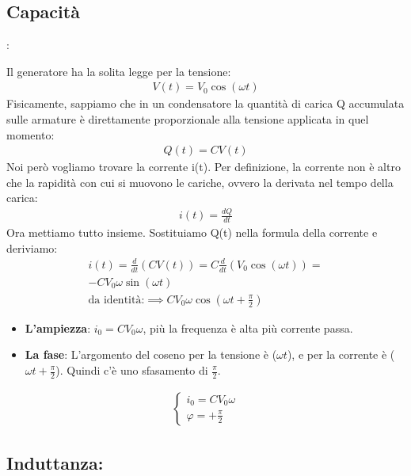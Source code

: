 \documentclass[a4paper, oneside]{article}
\begin{document}
\subsection*{Capacità}:
\begin{center}
\end{center}
Il generatore ha la solita legge per la tensione:
\begin{gather*}
    V(t) = V_0 \cos(\omega t)
\end{gather*}
Fisicamente, sappiamo che in un condensatore la quantità di carica Q accumulata sulle armature è direttamente proporzionale alla tensione applicata in quel momento:
\begin{gather*}
    Q(t) = C V(t)
\end{gather*}
Noi però vogliamo trovare la corrente i(t). Per definizione, la corrente non è altro che la rapidità con cui si muovono le cariche, ovvero la derivata nel tempo della carica:
\begin{gather*}
    i(t) = \frac{dQ}{dt}
\end{gather*}
Ora mettiamo tutto insieme. Sostituiamo Q(t) nella formula della corrente e deriviamo:
\begin{gather*}
    i(t) = \frac{d}{dt} (C V(t)) = C \frac{d}{dt} (V_0 \cos(\omega t)) =\\
     - C V_0 \omega \sin(\omega t)\\
     \text{da identità:} \implies C V_0 \omega \cos(\omega t + \frac{\pi}{2})
\end{gather*}
\begin{itemize}
    \item \textbf{L'ampiezza}: $i_0 = C V_0 \omega$, più la frequenza è alta più corrente passa.
    \item \textbf{La fase}: L'argomento del coseno per la tensione è ($\omega t$), e per la corrente è ($\omega t + \frac{\pi}{2}$). Quindi c'è uno sfasamento di $\frac{\pi}{2}$.
\end{itemize}
\begin{gather*}
    \begin{cases}
        i_0 = C V_0 \omega\\
        \varphi = +\frac{\pi}{2}
    \end{cases}
\end{gather*}
\subsection*{Induttanza:}
\begin{center}
\end{center}
\end{document}
